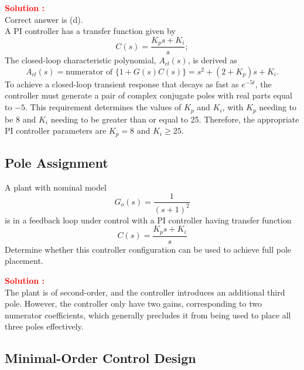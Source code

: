 \documentclass[12pt]{article}
\begin{document}
\textbf{\textcolor{red}{Solution :}}\\
Correct answer is (d).\\
A PI controller has a transfer function given by
\begin{equation}
C(s) = \frac{K_ps + K_i}{s};
\end{equation}
The closed-loop characteristic polynomial, \(A_{cl}(s)\), is derived as
\begin{equation}
A_{cl}(s) = \text{numerator of } \{1 + G(s)C(s)\} = s^2 + (2 + K_p)s + K_i.
\end{equation}
To achieve a closed-loop transient response that decays as fast as \(e^{-5t}\), the controller must generate a pair of complex conjugate poles with real parts equal to \(-5\). This requirement determines the values of \(K_p\) and \(K_i\), with \(K_p\) needing to be 8 and \(K_i\) needing to be greater than or equal to 25. Therefore, the appropriate PI controller parameters are \(K_p = 8\) and \(K_i \geq 25\).

\clearpage

\subsection{Pole Assignment}

A plant with nominal model
\begin{equation}
G_o(s) = \frac{1}{(s + 1)^2}
\end{equation}
is in a feedback loop under control with a PI controller having transfer function
\begin{equation}
C(s) = \frac{K_ps + K_i}{s}
\end{equation}
Determine whether this controller configuration can be used to achieve full pole placement.

\textbf{\textcolor{red}{Solution :}} \\ 
The plant is of second-order, and the controller introduces an additional third pole. However, the controller only have two gains, corresponding to two numerator coefficients, which generally precludes it from being used to place all three poles effectively.
\clearpage

\subsection{Minimal-Order Control Design}
\end{document}
